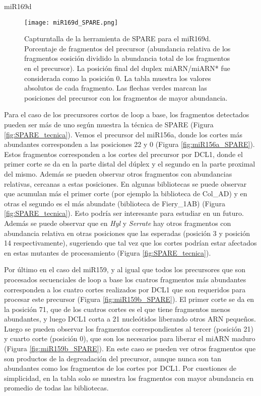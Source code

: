 \begin{landscape}                                                                      miR169d
\begin{figure}[htbp!] 
        \centering    
        \texttt{[image: miR169d\_SPARE.png]}
        \caption[Captura de pantalla de la herramienta de SPARE para el miR169d]{Capturntalla de la herramienta de SPARE para el miR169d.
        Porcentaje de fragmentos del precursor (abundancia relativa de los fragmentos eosición dividido la abundancia total de los fragmentos en el precursor).
        La posición final del duplex miARN/miARN* fue considerada como la posición 0.
        La tabla muestra los valores absolutos de cada fragmento.
        Las flechas verdes marcan las posiciones del precursor con los fragmentos de mayor abundancia. 
        }
	 \label{fig:miR169d_SPARE}
    \end{figure}
\end{landscape}

Para el caso de los precursores cortos de loop a base, los fragmentos detectados pueden ser más de uno según muestra la técnica de SPARE (Figura \ref{fig:SPARE_tecnica}).
Vemos el precursor del miR156a, donde los cortes más abundantes corresponden a las posiciones 22 y 0 (Figura \ref{fig:miR156a_SPARE}).
Estos fragmentos corresponden a los cortes del precursor por DCL1, donde el primer corte se da en la parte distal del dúplex y el segundo en la parte proximal del mismo.
Además se pueden observar otros fragmentos con abundancias relativas, cercanas a estas posiciones. 
En algunas bibliotecas se puede observar que acumulan más el primer corte (por ejemplo la biblioteca de Col\_AD) y en otras el segundo es el más abundate (biblioteca de Fiery\_1AB) (Figura \ref{fig:SPARE_tecnica}).
Esto podría ser interesante para estudiar en un futuro.
Además se puede observar que en \textit{Hyl} y \textit{Serrate} hay otros fragmentos con abundancia relativa en otras posiciones que las esperadas (posición 3 y posición 14 respectivamente), sugeriendo que tal vez que los cortes podrían estar afectados en estas mutantes de procesamiento (Figura \ref{fig:SPARE_tecnica}).

Por último en el caso del miR159, y al igual que todos los precursores que son procesados secuenciales de loop a base los cuatros fragmentos más abundantes corresponden a los cuatro cortes realizados por DCL1 que son requeridos para procesar este precursor (Figura \ref{fig:miR159b_SPARE}).
El primer corte se da en la posición 71, que de los cuatros cortes es el que tiene fragmentos menos abundantes, y luego DCL1 corta a 21 nucleótidos liberando otros ARN pequeños.
Luego se pueden observar los fragmentos correspondientes al tercer (posición 21) y cuarto corte (posición 0), que son los necesarios para liberar el miARN maduro (Figura \ref{fig:miR159b_SPARE}).
En este caso se pueden ver otros fragmentos que son productos de la degreadación del precursor, aunque nunca son tan abundantes como los fragmentos de los cortes por DCL1.
Por cuestiones de simplicidad, en la tabla solo se muestra los fragmentos con mayor abundancia en promedio de todas las bibliotecas.


